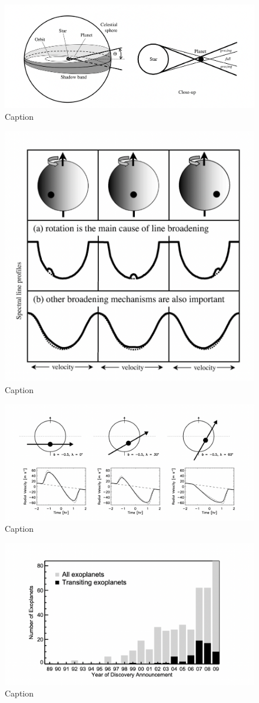 \documentclass[oneside,12pt]{amsart}
\numberwithin{page}{section}
\begin{document}
\begin{figure}
    \centering
    \includegraphics[width=0.5\linewidth]{figs/winn_fig3.png}
    \caption{Caption}
    \label{fig:enter-label}
\end{figure}

\begin{figure}
    \centering
    \includegraphics[width=0.5\linewidth]{figs/winn_fig5.png}
    \caption{Caption}
    \label{fig:enter-label}
\end{figure}

\begin{figure}
    \centering
    \includegraphics[width=0.5\linewidth]{figs/winn_fig6.png}
    \caption{Caption}
    \label{fig:enter-label}
\end{figure}

\begin{figure}
    \centering
    \includegraphics[width=0.5\linewidth]{figs/winn_fig7.png}
    \caption{Caption}
    \label{fig:enter-label}
\end{figure}
\end{document}
